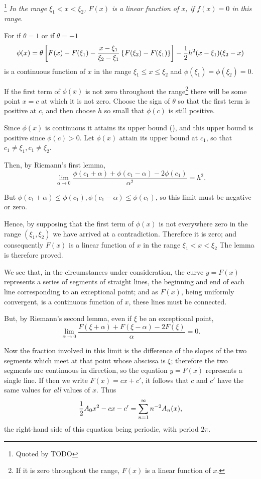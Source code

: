 \footnote{Quoted by TODO} \emph{In the range $\xi_{1} < x < \xi_{2}$,
  $F(x)$ is a linear function of $x$, if $f(x) = 0$ in this range.}

For if $\theta = 1$ or if $\theta = -1$
$$
\phi(x)
=
\theta \left[ 
  F(x)
  - F(\xi_{1})
  - \frac{x - \xi_{1}}{\xi_{2} - \xi_{1}} \left\{ 
    F(\xi_{2}) - F(\xi_{1})
   \right\}
 \right]
-
\frac{1}{2} h^{2} (x - \xi_{1})(\xi_{2} - x)
$$
is a continuous function of $x$ in the range
$\xi_{1} \leq x \leq \xi_{2}$ and $\phi(\xi_{1}) = \phi(\xi_{2}) = 0$.
%
%

If the first term of $\phi(x)$ is not zero throughout the
range\footnote{If it is zero throughout the range, $F(x)$
  is a linear function of $x$.}
there will be some point $x=c$ at which it is not zero. Choose the sign of $\theta$
so that the first term is positive at $c$, and then choose $h$ so small
that $\phi(c)$ is still positive.

Since $\phi(x)$ is continuous it attains its upper bound (), and
this upper bound is positive since $\phi(c) > 0$. Let $\phi(x)$ attain its
upper bound at $c_{1}$, so that $c_{1} \neq \xi_{1}, c_{1} \neq \xi_{2}$.

Then, by Riemann's first
lemma,
$$
\lim_{\alpha \rightarrow 0}
\frac{\phi(c_{1} + \alpha) + \phi(c_{1} - \alpha) - 2 \phi(c_{1})}{\alpha^{2}}
=
h^{2}.
$$

But $\phi(c_{1} + \alpha) \leq \phi(c_{1}), \phi(c_{1} - \alpha) \leq \phi(c_{1})$, so this limit must be
negative or zero.

Hence, by supposing that the first term of $\phi(x)$ is not everywhere zero
in the range $(\xi_{1}, \xi_{2})$ we have arrived at a contradiction. Therefore it
is zero; and consequently $F(x)$ is a linear function of $x$ in the range
$\xi_{1} < x < \xi_{2}$
The lemma is therefore proved.

We see that, in the circumstances under consideration, the curve $y = F(x)$
represents a series of segments of straight lines, the beginning
and end of each line corresponding to an exceptional point; and as $F(x)$,
being uniformly convergent, is a continuous function of $x$, these
lines must be connected.

But, by Riemann's second lemma, even if $\xi$ be an exceptional point,
$$
\lim_{\alpha \rightarrow 0}
\frac{F(\xi + \alpha) + F(\xi - \alpha) - 2F(\xi)}{\alpha}
=
0.
$$

Now the fraction involved in this limit is the difference of the
slopes of the two segments which meet at that point whose abscissa is
$\xi$; therefore the two segments are continuous in direction, so the
equation $y = F(x)$ represents a single line. If then we write
$F(x) = cx + c'$, it follows that $c$ and $c'$ have the same values for
\emph{all} values of $x$. Thus
$$
\frac{1}{2} A_{0} x^{2} - cx - c'
=
\sum_{n=1}^{\infty} n^{-2} A_{n}(x),
$$
the right-hand side of this equation being periodic, with period $2\pi$.

